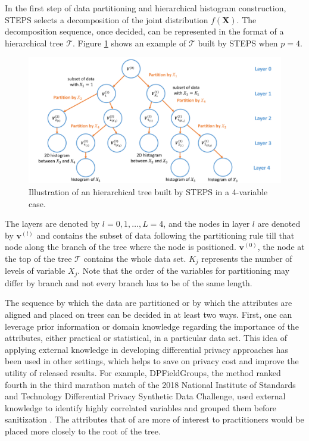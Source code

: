 \documentclass[12pt, A4]{article}
\newcommand{\vv}{\mathbf{v}}
\theoremstyle{plain}
\theoremstyle{exampstyle}\newtheorem{defn}{Definition}
\theoremstyle{exampstyle}\newtheorem{lem}{Lemma}
\theoremstyle{exampstyle}\newtheorem{cor}{Corollary}
\theoremstyle{exampstyle}\newtheorem{pro}{Proposition}
\theoremstyle{exampstyle}\newtheorem{cla}{Claim}
\theoremstyle{exampstyle}\newtheorem{rem}{Remark}
\begin{document}
In the first step of data partitioning and hierarchical histogram construction, STEPS selects a decomposition of the joint distribution $f(\mathbf{X})$. The decomposition sequence, once decided, can be represented in the format of a hierarchical tree $\mathcal{T}$. Figure \ref{fig:steps} shows an example of $\mathcal{T}$ built by STEPS when $p=4$.  
\begin{figure}[!htb]
\vspace{-6pt}
\centerline{\includegraphics[width=6.5in]{STEPS.pdf}}
\caption{Illustration of an hierarchical tree built by STEPS in a 4-variable case.}\label{fig:steps}
\end{figure}
The layers are denoted by  $l=0,1,\ldots,L=4$, and the nodes in layer $l$ are denoted by $\vv^{(l)}$ and contains the subset of data following the partitioning rule till that node along the branch of the tree where the node is positioned. $\vv^{(0)}$, the node at the top of the tree $\mathcal{T}$ contains the whole data set. $K_j$ represents the number of levels of variable $X_j$. Note that the order of the variables for partitioning may differ by branch and not every branch has to be of the same length.

The sequence by which the data are partitioned or by which the attributes are aligned and placed on trees can be decided in at least two ways. First, one can leverage prior information or domain knowledge regarding the importance of the attributes, either practical or statistical, in a particular data set. This idea of applying external knowledge in developing differential privacy approaches has been used in other settings, which helps to save on privacy cost and improve the utility of released results. For example, DPFieldGroups, the method ranked fourth in the third marathon match of the 2018 National Institute of Standards and Technology Differential Privacy Synthetic Data Challenge, used external knowledge to identify highly correlated variables and grouped them before sanitization \citep{gardn999,bowen2019comparative}. The attributes that of are more of interest to practitioners would be placed more closely to the root of the tree.  
\end{document}
